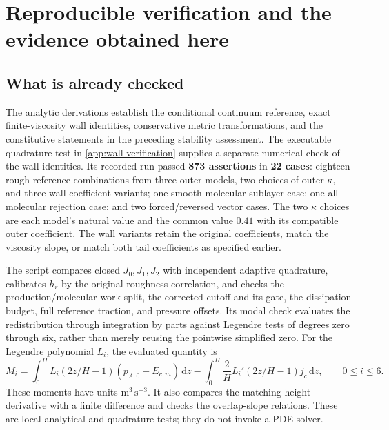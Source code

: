 \documentclass[11pt,a4paper]{article}
\numberwithin{equation}{section}
\newcommand{\dd}{\mathrm d}
\begin{document}
\section{Reproducible verification and the evidence obtained here}
\label{num:verification}

\subsection{What is already checked}

The analytic derivations establish the conditional continuum
reference, exact finite-viscosity wall identities, conservative
metric transformations, and the constitutive statements in the
preceding stability assessment.  The executable quadrature test in
\cref{app:wall-verification} supplies a separate numerical check of
the wall identities.  Its recorded run passed \textbf{873 assertions}
in \textbf{22 cases}: eighteen rough-reference combinations from
three outer models, two choices of outer $\kappa$, and three wall
coefficient variants; one smooth molecular-sublayer case; one
all-molecular rejection case; and two forced/reversed vector cases.
The two $\kappa$ choices are each model's natural value and the
common value $0.41$ with its compatible outer coefficient.  The
wall variants retain the original coefficients, match the viscosity
slope, or match both tail coefficients as specified earlier.

The script compares closed $J_0,J_1,J_2$ with independent adaptive
quadrature, calibrates $h_r$ by the original roughness correlation,
and checks the production/molecular-work split, the corrected
cutoff and its gate, the dissipation budget, full reference traction,
and pressure offsets.  Its modal check evaluates the
redistribution through integration by parts against Legendre tests
of degrees zero through six, rather than merely reusing the
pointwise simplified zero.  For the Legendre polynomial $L_i$,
the evaluated quantity is
\begin{equation}
 M_i=\int_0^H L_i(2z/H-1)(p_{A,0}-E_{c,m})\,\dd z
     -\int_0^H\frac2H L_i' (2z/H-1)j_c\,\dd z,
 \qquad 0\leq i\leq6 .
 \label{num:modal-check}
\end{equation}
These moments have units $\mathrm{m^3\,s^{-3}}$.  It also compares the matching-height
derivative with a finite difference and checks the overlap-slope
relations.  These are local analytical and quadrature tests; they
do not invoke a PDE solver.
\end{document}
